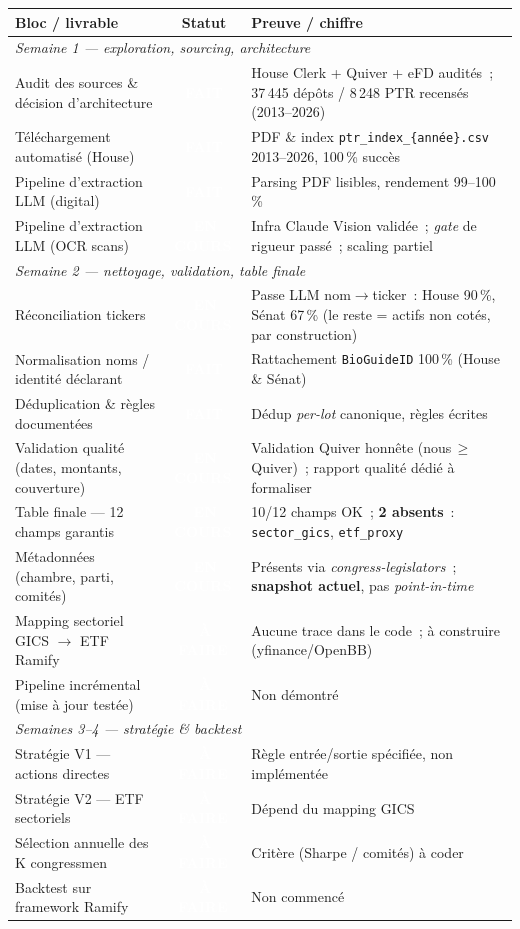 \documentclass[11pt,a4paper]{article}
\newcommand{\file}[1]{\texttt{\small #1}}
\newcommand{\nb}[1]{\textbf{#1}}
\newcommand{\badge}[2]{\colorbox{#1}{\textcolor{white}{\scriptsize\textbf{\,#2\,}}}}
\newcommand{\FAIT}{\badge{okgreen}{FAIT}}
\newcommand{\ENCOURS}{\badge{warn}{EN COURS}}
\newcommand{\AFAIRE}{\badge{todo}{\`A FAIRE}}
\begin{document}
{\renewcommand{\arraystretch}{1.35}
\begin{longtable}{p{4.7cm} c p{8.9cm}}
\toprule
\textbf{Bloc / livrable} & \textbf{Statut} & \textbf{Preuve / chiffre} \\
\midrule
\endhead
\multicolumn{3}{l}{\textit{\color{accent}Semaine 1 --- exploration, sourcing, architecture}}\\[2pt]
Audit des sources \& d\'ecision d'architecture & \FAIT & House Clerk + Quiver + eFD audit\'es~; 37\,445 d\'ep\^ots / 8\,248 PTR recens\'es (2013--2026)\\
T\'el\'echargement automatis\'e (House) & \FAIT & PDF \& index \file{ptr\_index\_\{ann\'ee\}.csv} 2013--2026, 100\,\% succ\`es\\
Pipeline d'extraction LLM (digital) & \FAIT & Parsing PDF lisibles, rendement 99--100\,\%\\
Pipeline d'extraction LLM (OCR scans) & \ENCOURS & Infra Claude Vision valid\'ee~; \emph{gate} de rigueur pass\'e~; scaling partiel\\
\midrule
\multicolumn{3}{l}{\textit{\color{accent}Semaine 2 --- nettoyage, validation, table finale}}\\[2pt]
R\'econciliation tickers & \ENCOURS & Passe LLM nom$\to$ticker~: House 90\,\%, S\'enat 67\,\% (le reste = actifs non cot\'es, par construction)\\
Normalisation noms / identit\'e d\'eclarant & \FAIT & Rattachement \file{BioGuideID} 100\,\% (House \& S\'enat)\\
D\'eduplication \& r\`egles document\'ees & \FAIT & D\'edup \emph{per-lot} canonique, r\`egles \'ecrites\\
Validation qualit\'e (dates, montants, couverture) & \ENCOURS & Validation Quiver honn\^ete (nous\,$\geq$\,Quiver)~; rapport qualit\'e d\'edi\'e \`a formaliser\\
Table finale --- 12 champs garantis & \ENCOURS & 10/12 champs OK~; \nb{2 absents}~: \file{sector\_gics}, \file{etf\_proxy}\\
M\'etadonn\'ees (chambre, parti, comit\'es) & \ENCOURS & Pr\'esents via \emph{congress-legislators}~; \nb{snapshot actuel}, pas \emph{point-in-time}\\
Mapping sectoriel GICS $\to$ ETF Ramify & \AFAIRE & Aucune trace dans le code~; \`a construire (yfinance/OpenBB)\\
Pipeline incr\'emental (mise \`a jour test\'ee) & \AFAIRE & Non d\'emontr\'e\\
\midrule
\multicolumn{3}{l}{\textit{\color{accent}Semaines 3--4 --- strat\'egie \& backtest}}\\[2pt]
Strat\'egie V1 --- actions directes & \AFAIRE & R\`egle entr\'ee/sortie sp\'ecifi\'ee, non impl\'ement\'ee\\
Strat\'egie V2 --- ETF sectoriels & \AFAIRE & D\'epend du mapping GICS\\
S\'election annuelle des K congressmen & \AFAIRE & Crit\`ere (Sharpe / comit\'es) \`a coder\\
Backtest sur framework Ramify & \AFAIRE & Non commenc\'e\\
\bottomrule
\end{longtable}}
\end{document}
